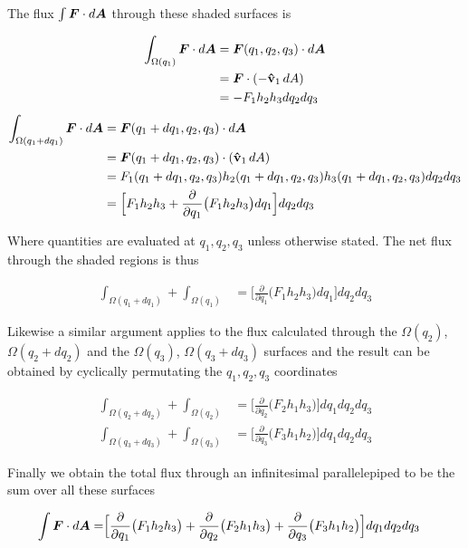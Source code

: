 \documentclass[twoside, a4paper]{article}
\begin{document}
The flux $\int \mbox{\boldmath$ F $} \cdot d\mbox{\boldmath$ A $}$ through these shaded surfaces is

\begin{align*}
\int_{\Omega(q_1)} \mbox{\boldmath$ F $} \cdot d\mbox{\boldmath$ A $}	 & = \mbox{\boldmath$ F $}(q_1,q_2,q_3) \cdot d\mbox{\boldmath$ A $} \\
		 & = \mbox{\boldmath$ F $} \cdot (-\mathbf{\hat{v}}_1 \, dA) \\
		 & = -F_1 h_2 h_3 dq_2 dq_3
\end{align*}
\begin{align*}
\int_{\Omega(q_1+dq_1)} \mbox{\boldmath$ F $} \cdot d\mbox{\boldmath$ A $} & = \mbox{\boldmath$ F $} (q_1+dq_1,q_2,q_3) \cdot d\mbox{\boldmath$ A $} \\
	 & = \mbox{\boldmath$ F $} (q_1+dq_1,q_2,q_3) \cdot (\mathbf{\hat{v}}_1 \, dA) \\
	 & = F_1(q_1+dq_1,q_2,q_3) h_2(q_1+dq_1,q_2,q_3) h_3(q_1+dq_1,q_2,q_3) dq_2 dq_3 \\
	 & = \Big[ F_1 h_2 h_3 + \frac{\partial}{\partial q_1} \big( F_1 h_2 h_3 \big) dq_1 \Big] dq_2 dq_3
\end{align*}

Where quantities are evaluated at $q_1,q_2,q_3$ unless otherwise stated.
The net flux through the shaded regions is thus

\begin{align*}
\int_{\Omega(q_1+dq_1)} + \int_{\Omega(q_1)} & = \Big[ \frac{\partial}{\partial q_1} \big( F_1 h_2 h_3 \big) dq_1 \Big] dq_2 dq_3
\end{align*}

Likewise a similar argument applies to the flux calculated through the $\Omega(q_2)$, $\Omega(q_2+dq_2)$ and the $\Omega(q_3)$, $\Omega(q_3+dq_3)$ surfaces and the result can be obtained by cyclically permutating the $q_1, q_2, q_3$ coordinates

\begin{align*}
\int_{\Omega(q_2+dq_2)} + \int_{\Omega(q_2)} & = \Big[ \frac{\partial}{\partial q_2} \big( F_2 h_1 h_3 \big) \Big] dq_1 dq_2 dq_3 \\
\int_{\Omega(q_3+dq_3)} + \int_{\Omega(q_3)} & = \Big[ \frac{\partial}{\partial q_3} \big( F_3 h_1 h_2 \big) \Big] dq_1 dq_2 dq_3
\end{align*}

Finally we obtain the total flux through an infinitesimal parallelepiped to be the sum over all these surfaces

\begin{equation}
\label{eq:flux}
\begin{split}
\int \mbox{\boldmath$ F $} \cdot d\mbox{\boldmath$ A $} = &  
\Big[
\frac{\partial}{\partial q_1} \big( F_1 h_2 h_3 \big) + 
\frac{\partial}{\partial q_2} \big( F_2 h_1 h_3 \big) + 
\frac{\partial}{\partial q_3} \big( F_3 h_1 h_2 \big)
\Big] dq_1 dq_2 dq_3
\end{split}
\end{equation}
\end{document}

